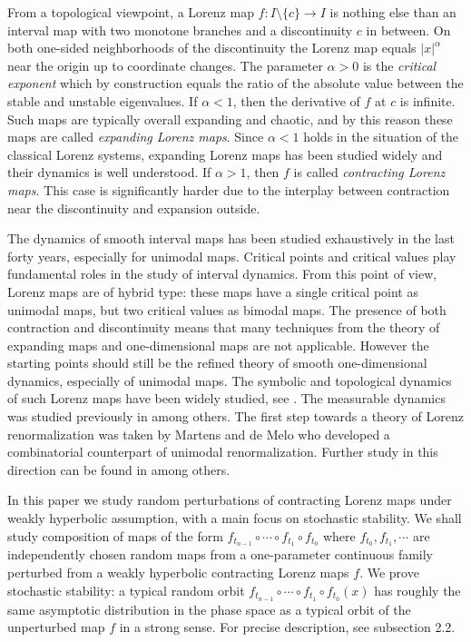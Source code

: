 \documentclass[11pt,oneside]{article}
\theoremstyle{plain}
\numberwithin{equation}{section}
\numberwithin{figure}{section}
\numberwithin{table}{section}
\begin{document}
From a topological viewpoint, a Lorenz map $f : I \setminus \{ c\} \to I$ is nothing else than an interval map with two monotone branches and a discontinuity $c$ in between. On both one-sided neighborhoods of the discontinuity the Lorenz map equals $|x|^{\alpha}$ near the origin up to coordinate changes. The parameter $\alpha>0$ is the {\it critical exponent} which by construction equals the ratio of the absolute value between the stable and unstable eigenvalues. If $\alpha < 1$, then the derivative of $f$ at $c$ is infinite. Such maps are typically overall expanding and chaotic, and by this reason these maps are called {\it expanding Lorenz maps}. Since $\alpha<1$ holds in the situation of the classical Lorenz systems, expanding Lorenz maps has been studied widely and their dynamics is well understood. If $\alpha>1$, then $f$ is called {\it contracting Lorenz maps}. This case is significantly harder due to the interplay between contraction near the discontinuity and expansion outside. 


The dynamics of smooth interval maps has been studied exhaustively in the last forty years, especially for unimodal maps. Critical points and critical values play fundamental roles in the study of interval dynamics. From this point of view, Lorenz maps are of hybrid type: these maps have a single critical point as unimodal maps, but two critical values as bimodal maps. The presence of both contraction and discontinuity means that many techniques from the theory of expanding maps and one-dimensional maps are not applicable. However the starting points should still be the refined theory of smooth one-dimensional dynamics, especially of  unimodal maps. The symbolic and topological dynamics of such Lorenz maps have been widely studied, see \cite{B, KP}. The measurable dynamics was studied previously in \cite{AS, CD, KP, Ro, Me1} among others. The first step towards a theory of Lorenz renormalization was taken by Martens and de Melo \cite{MM} who developed a combinatorial counterpart of unimodal renormalization. Further study in this direction can be found in \cite{GG,  MW} among others.

In this paper we study random perturbations of contracting Lorenz maps under weakly hyperbolic assumption, with a main focus on stochastic stability. We shall study composition of maps of the form $f_{t_{n-1}} \circ \cdots \circ f_{t_1} \circ f_{t_0}$ where $f_{t_0}, f_{t_1}, \cdots$ are independently chosen random maps from a one-parameter continuous family perturbed from a weakly hyperbolic contracting Lorenz maps $f$. We prove stochastic stability: a typical random orbit  $f_{t_{n-1}} \circ \cdots \circ f_{t_1} \circ f_{t_0}(x)$ has roughly the same asymptotic distribution in the phase space as a typical orbit of the unperturbed map $f$ in a strong sense. For precise description, see subsection 2.2.
\end{document}
